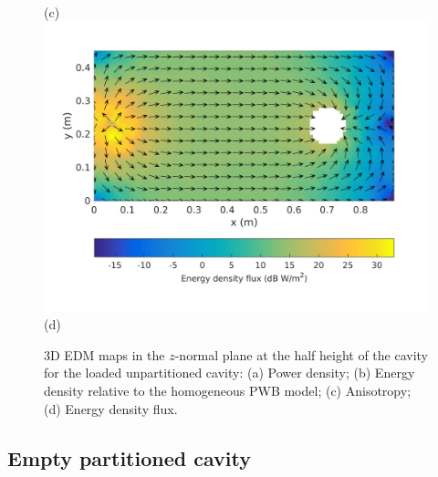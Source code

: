 \documentclass[a4paper]{article}
\numberwithin{equation}{section}
\begin{document}
\begin{figure}[ht]
\begin{center}
{\footnotesize (c)}\\
\vspace{2mm}
\includegraphics[trim={0 8mm 0 12mm},clip,width=0.52\linewidth]{figures/SDM_3D_SL_EnergyDensityFluxMap}\\
{\footnotesize (d)}\\
\vspace{-2mm}
\caption{\label{fg:unpartcyl_maps} 3D EDM maps in the $z$-normal plane at the half height of the cavity for the 
loaded unpartitioned cavity: (a) Power density; (b) Energy density relative to the homogeneous PWB model;
(c) Anisotropy; (d) Energy density flux.}
\end{center}
\end{figure}

\subsection[Empty partitioned cavity]{Empty partitioned cavity}
\label{sc:res:emptypart}
\end{document}
